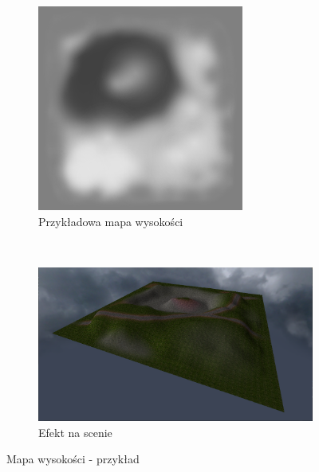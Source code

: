 \documentclass[a4paper,twoside,12pt]{book}
\begin{document}
\begin{figure}[H]
    \centering
    \begin{subfigure}[b]{0.4\textwidth}
        \includegraphics[width=\textwidth]{res/height_map.png}
        \caption{Przykładowa mapa wysokości}
        \label{fig:height_map}
    \end{subfigure}
    ~ %
    \begin{subfigure}[b]{0.55\textwidth}
        \includegraphics[width=\textwidth]{res/terrain_example.png}
        \caption{Efekt na scenie}
        \label{fig:terrain_example}
    \end{subfigure}
    \caption{Mapa wysokości - przykład}
    \label{fig:terrain_heightexample}
\end{figure}
\end{document}
